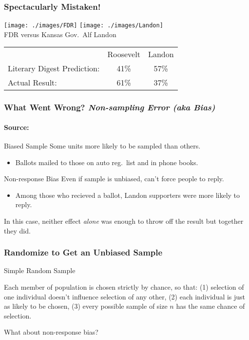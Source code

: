 \documentclass[handout]{beamer}
\begin{document}
\begin{frame}
\frametitle{Spectacularly Mistaken!}

\begin{center}
\texttt{[image: ./images/FDR]}
\texttt{[image: ./images/Landon]}\\
\small FDR versus Kansas Gov.\ Alf Landon
\end{center}

\normalsize

\begin{table}
\begin{tabular}{lcc}
&Roosevelt&Landon\\
Literary Digest Prediction: &41\% & \alert{57\%}\\
Actual Result: &\alert{61\%} & 37\%

\end{tabular}

\end{table}

\end{frame}
\begin{frame}

\frametitle{What Went Wrong? \emph{Non-sampling Error (aka Bias)}}
\framesubtitle{Source: \href{http://www.jstor.org/stable/10.2307/2749114}{}}

\begin{block}{Biased Sample}
Some units more likely to be sampled than others.
	\begin{itemize}
		\item Ballots mailed to those on auto reg.\ list and in phone books.
	\end{itemize}
\end{block}

\begin{block}{Non-response Bias}
Even if sample is unbiased, can't force people to reply.
	\begin{itemize}
		\item Among those who recieved a ballot, Landon supporters were more likely to reply.
	\end{itemize}
\end{block}
\alert{In this case, neither effect \emph{alone} was enough to throw off the result but together they did.}
\end{frame}
\begin{frame}
\frametitle{Randomize to Get an Unbiased Sample}

\begin{block}{Simple Random Sample}

Each member of population is chosen strictly by chance, so that: (1) selection of one individual doesn't influence selection of any other, (2) each individual is just as likely to be chosen, (3) every possible sample of size $n$ has the same chance of selection.

\end{block}

\begin{block}{What about non-response bias?}
\end{block}
\end{frame}
\end{document}

